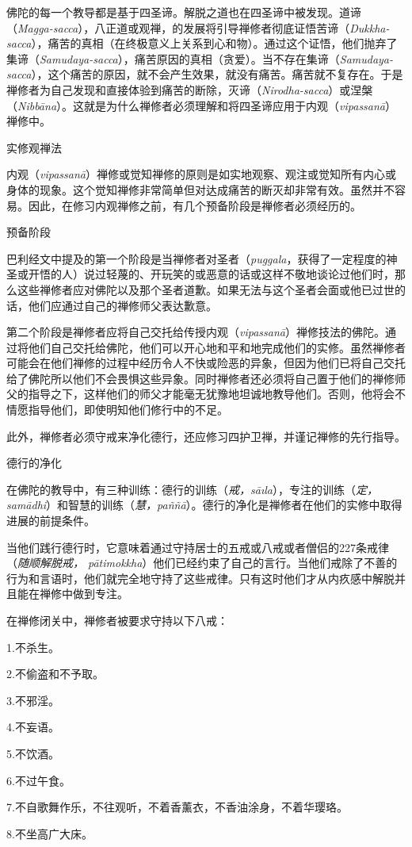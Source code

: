 佛陀的每一个教导都是基于四圣谛。解脱之道也在四圣谛中被发现。道谛（{\it Magga-sacca}），八正道或观禅，的发展将引导禅修者彻底证悟苦谛（{\it Dukkha-sacca}），痛苦的真相（在终极意义上关系到心和物）。通过这个证悟，他们抛弃了集谛（{\it Samudaya-sacca}），痛苦原因的真相（贪爱）。当不存在集谛（{\it Samudaya-sacca}），这个痛苦的原因，就不会产生效果，就没有痛苦。痛苦就不复存在。于是禅修者为自己发现和直接体验到痛苦的断除，灭谛（{\it Nirodha-sacca}）或涅槃（{\it Nibb\=ana}）。这就是为什么禅修者必须理解和将四圣谛应用于内观（{\it vipassan\=a}）禅修中。

\ssubsectnon 实修观禅法

内观（{\it vipassan\=a}）禅修或觉知禅修的原则是如实地观察、观注或觉知所有内心或身体的现象。这个觉知禅修非常简单\1但对达成痛苦的断灭却非常有效。虽然并不容易。因此，在修习内观禅修之前，有几个预备阶段是禅修者必须经历的。

\sssubsectnoni 预备阶段

巴利经文中提及的第一个阶段是当禅修者对圣者（{\it puggala}，获得了一定程度的神圣或开悟的人）说过轻蔑的、开玩笑的或恶意的话或这样不敬地谈论过他们时，那么这些禅修者应对佛陀以及那个圣者道歉。如果无法与这个圣者会面或他已过世的话，他们应通过自己的禅修师父表达歉意。

第二个阶段是禅修者应将自己交托给传授内观（{\it vipassan\=a}）禅修技法的佛陀。通过将他们自己交托给佛陀，他们可以开心地和平和地完成他们的实修。虽然禅修者可能会在他们禅修的过程中经历令人不快或险恶的异象，但因为他们已将自己交托给了佛陀所以他们不会畏惧这些异象。同时禅修者还必须将自己置于他们的禅修师父的指导之下，这样他们的师父才能毫无犹豫地坦诚地教导他们。否则，他将会不情愿指导他们，即使明知他们修行中的不足。

此外，禅修者必须守戒来净化德行，还应修习四护卫禅，并谨记禅修的先行指导。

\sssubsectnonb 德行的净化

在佛陀的教导中，有三种训练：德行的训练（{\it 戒，s\=a\i la}），专注的训练（{\it 定，sam\=adhi}）和智慧的训练\1（{\it 慧，pa\~n\~n\=a}）。德行的净化是禅修者在他们的实修中取得进展的前提条件。

当他们践行德行时，它意味着通过守持居士的五戒或八戒或者僧侣的227条戒律（{\it 随顺解脱戒， p\=atimokkha}）他们已经约束了自己的言行。当他们戒除了不善的行为和言语时，他们就完全地守持了这些戒律。只有这时他们才从内疚感中解脱并且能在禅修中做到专注。

在禅修闭关中，禅修者被要求守持以下八戒：

{
\leftskip=1.6pc
\item{1.}不杀生。
\item{2.}不偷盗和不予取。
\item{3.}不邪淫。
\item{4.}不妄语。
\item{5.}不饮酒。
\item{6.}不过午食。
\item{7.}不自歌舞作乐，不往观听，不着香薰衣，不香油涂身，不着华璎珞。
\item{8.}不坐高广大床。

}

